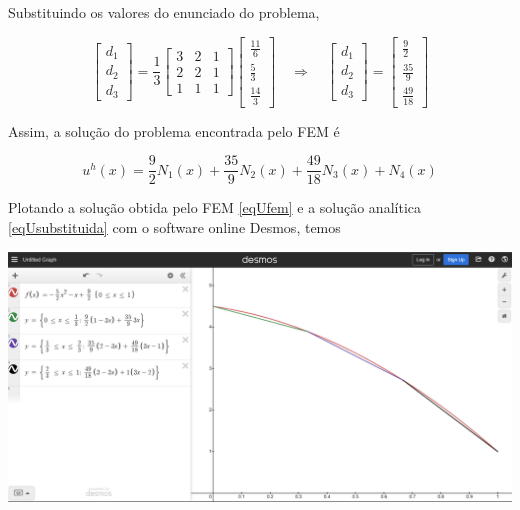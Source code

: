 \documentclass[12pt]{scrartcl}
\newcommand{\logo}{\quad \Rightarrow \quad}
\begin{document}
\endgroup

Substituindo os valores do enunciado do problema, 

\begingroup
\renewcommand*{\arraystretch}{2}

\[
    \begin{bmatrix}
        d_1    \\
        d_2    \\
        d_3
    \end{bmatrix} =
    \frac{1}{3}
    \begin{bmatrix}
        3  & 2 & 1  \\
        2 & 2  & 1 \\
        1  & 1 & 1
    \end{bmatrix}
    \begin{bmatrix}
        \frac{11}{6} \\
        \frac{5}{3} \\
        \frac{14}{3} 
    \end{bmatrix}
    \logo
    \begin{bmatrix}
        d_1    \\
        d_2    \\
        d_3
    \end{bmatrix} =
    \begin{bmatrix}
        \frac{9}{2} \\
        \frac{35}{9} \\
        \frac{49}{18} 
    \end{bmatrix}
\]

\endgroup

Assim, a solução do problema encontrada pelo FEM é   

\begin{equation}\label{eqUfem}
    \boxed{u^h(x) = \frac{9}{2}N_1(x) + \frac{35}{9}N_2(x) + \frac{49}{18}N_3(x) + N_{4}(x)}
\end{equation}


Plotando a solução obtida pelo FEM \eqref{eqUfem} e a solução analítica \eqref{eqUsubstituida} com o software online Desmos, 
temos


\begin{center}
    \includegraphics[scale=0.35]{grafico_ux_AA03.png}
\end{center}
\end{document}
